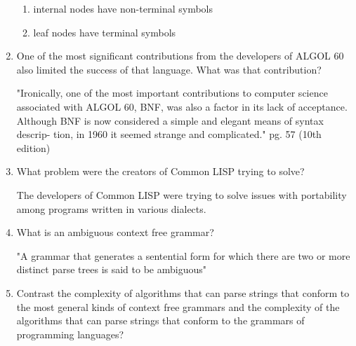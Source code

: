 \begin{enumerate}
\begin{answer}
  \begin{enumerate}
    \item internal nodes have non-terminal symbols
    \item leaf nodes have terminal symbols
    \end{enumerate}

    \end{answer}


  \item One of the most significant contributions from the developers
    of ALGOL 60 also limited the success of that language. What was
    that contribution?

  \begin{answer}

    "Ironically, one of the most important contributions to computer science associated with ALGOL 60, BNF, was also a factor in its lack of acceptance. Although BNF is now considered a simple and elegant means of syntax descrip- tion, in 1960 it seemed strange and complicated." 
    pg. 57 (10th edition)

    \end{answer}

  \item What problem were the creators of Common LISP trying to solve?

  \begin{answer}

    The developers of Common LISP were trying to solve issues with portability among programs written in various dialects.

    \end{answer}

  \item What is an ambiguous context free grammar?

  \begin{answer}

    "A grammar that generates a sentential form for which there are two or more distinct parse trees is said to be ambiguous"

    \end{answer}

  \item Contrast the complexity of algorithms that can parse strings
    that conform to the most general kinds of context free grammars
    and the complexity of the algorithms that can parse strings that
    conform to the grammars of programming languages?

  \begin{answer}


\end{answer}
\end{enumerate}
